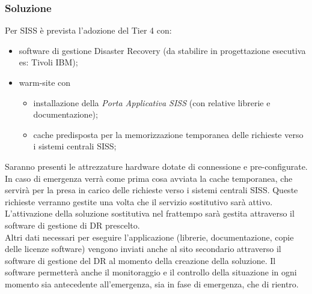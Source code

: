 \subsubsection{Soluzione}
Per SISS è prevista l'adozione del Tier 4 con:
\begin{itemize}
\item software di gestione Disaster Recovery (da stabilire in progettazione esecutiva es: Tivoli IBM);
\item warm-site con
  \begin{itemize}
  \item installazione della \textit{Porta Applicativa SISS} (con relative librerie e documentazione);
  \item cache predisposta per la memorizzazione temporanea delle richieste verso i sistemi centrali SISS;
  \end{itemize}
\end{itemize}
Saranno presenti le attrezzature hardware dotate di connessione e pre-configurate. In caso di emergenza verrà come prima cosa avviata la cache temporanea, che servirà per la presa in carico delle richieste verso i sistemi centrali SISS. Queste richieste verranno gestite una volta che il servizio sostitutivo sarà attivo. L'attivazione della soluzione sostitutiva nel frattempo sarà gestita attraverso il software di gestione di DR prescelto.
\\
Altri dati necessari per eseguire l'applicazione (librerie, documentazione, copie delle licenze software) vengono inviati anche al sito secondario attraverso il software di gestione del DR al momento della creazione della soluzione. Il software permetterà anche il monitoraggio e il controllo della situazione in ogni momento sia antecedente all'emergenza, sia in fase di emergenza, che di rientro.

